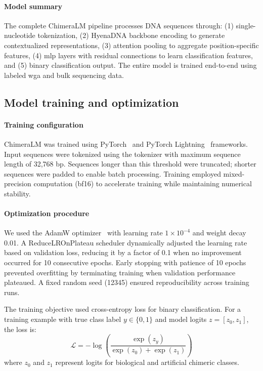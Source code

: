 \documentclass[pdflatex,sn-nature,lineno]{sn-jnl}%
\theoremstyle{thmstyleone}%
\theoremstyle{thmstyletwo}%
\theoremstyle{thmstylethree}%
\begin{document}
\paragraph{Model summary}
The complete ChimeraLM pipeline processes DNA sequences through: (1) single-nucleotide tokenization, (2) HyenaDNA backbone encoding to generate contextualized representations, (3) attention pooling to aggregate position-specific features, (4) \gls{mlp} layers with residual connections to learn classification features, and (5) binary classification output. 
The entire model is trained end-to-end using labeled \gls{wga} and bulk sequencing data.


\subsection*{Model training and optimization}

\paragraph{Training configuration}
ChimeraLM was trained using PyTorch~\cite{paszke2019pytorch} and PyTorch Lightning~\cite{Falcon_PyTorch_Lightning_2019} frameworks.
Input sequences were tokenized using the tokenizer with maximum sequence length of 32,768 bp.
Sequences longer than this threshold were truncated; shorter sequences were padded to enable batch processing. 
Training employed mixed-precision computation (bf16) to accelerate training while maintaining numerical stability.

\paragraph{Optimization procedure}
We used the AdamW optimizer~\cite{adamw} with learning rate $1 \times 10^{-4}$ and weight decay 0.01.
A ReduceLROnPlateau scheduler dynamically adjusted the learning rate based on validation loss, reducing it by a factor of 0.1 when no improvement occurred for 10 consecutive epochs.
Early stopping with patience of 10 epochs prevented overfitting by terminating training when validation performance plateaued. 
A fixed random seed (12345) ensured reproducibility across training runs.

The training objective used cross-entropy loss for binary classification. For a training example with true class label $y \in \{0,1\}$ and model logits $z = [z_0, z_1]$, the loss is:
\[
\mathcal{L} = -\log\left(\frac{\exp(z_y)}{\exp(z_0) + \exp(z_1)}\right)
\]
where $z_0$ and $z_1$ represent logits for biological and artificial chimeric classes.
\end{document}
